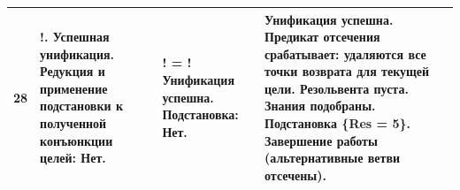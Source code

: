 \begin{tabularx}{\textwidth}{|c|>{\small}X|>{\small}X|>{\small}X|}
	28                                                                                             &
	!. \newline
	Успешная унификация. \newline
	Редукция и применение подстановки к полученной конъюнкции целей: \newline
	Нет.                                                                                           &
	! = \newline
	! \newline
	Унификация успешна. \newline
	Подстановка: \newline
	Нет.                                                                                           &
	Унификация успешна. \newline
	Предикат отсечения срабатывает: удаляются все точки возврата для текущей цели. \newline
	Резольвента пуста. \newline
	Знания подобраны. Подстановка \{Res = 5\}. \newline
	Завершение работы (альтернативные ветви отсечены).                                               \\
	\hline
\end{tabularx}
